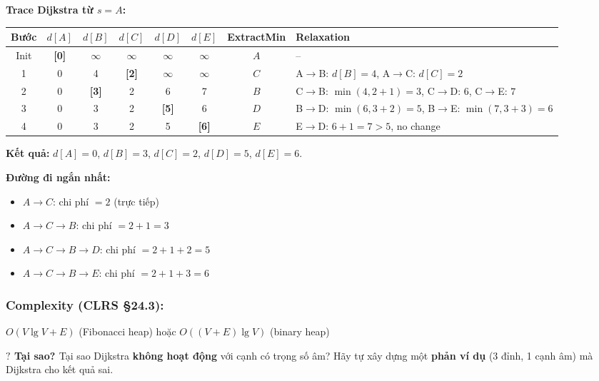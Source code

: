\documentclass[10pt]{article}
\newcommand{\whyprompt}[1]{%
  \begin{tcolorbox}[colback=yellow!8!white, colframe=orange!70!yellow, leftrule=3pt,
    toprule=0pt, bottomrule=0pt, rightrule=0pt,
    boxsep=2pt, left=6pt, right=6pt, top=4pt, bottom=4pt]
  {\small\textbf{\textcolor{orange!80!black}{$\boldsymbol{?}$ Tại sao? }} #1}
  \end{tcolorbox}}
\providecommand{\tightlist}{\setlength{\itemsep}{0pt}\setlength{\parskip}{0pt}}
\begin{document}
\textbf{Trace Dijkstra từ $s = A$:}

\begin{center}
\begin{tabular}{|c|c|c|c|c|c|c|l|}
\hline
\textbf{Bước} & $d[A]$ & $d[B]$ & $d[C]$ & $d[D]$ & $d[E]$ & \textbf{ExtractMin} & \textbf{Relaxation} \\
\hline
Init & \cellcolor{green!15}\textbf{[0]} & $\infty$ & $\infty$ & $\infty$ & $\infty$ & $A$ & -- \\
\hline
1 & 0 & 4 & \cellcolor{green!15}\textbf{[2]} & $\infty$ & $\infty$ & $C$ & \small A$\to$B: $d[B]=4$, A$\to$C: $d[C]=2$ \\
\hline
2 & 0 & \cellcolor{green!15}\textbf{[3]} & 2 & 6 & 7 & $B$ & \small C$\to$B: $\min(4, 2{+}1){=}3$, C$\to$D: $6$, C$\to$E: $7$ \\
\hline
3 & 0 & 3 & 2 & \cellcolor{green!15}\textbf{[5]} & 6 & $D$ & \small B$\to$D: $\min(6, 3{+}2){=}5$, B$\to$E: $\min(7, 3{+}3){=}6$ \\
\hline
4 & 0 & 3 & 2 & 5 & \cellcolor{green!15}\textbf{[6]} & $E$ & \small E$\to$D: $6{+}1{=}7 > 5$, no change \\
\hline
\end{tabular}
\label{tab:dijkstra-trace}
\end{center}

\textbf{Kết quả:} $d[A]=0$, $d[B]=3$, $d[C]=2$, $d[D]=5$, $d[E]=6$.

\textbf{Đường đi ngắn nhất:}
\begin{itemize}
\tightlist
\item $A \to C$: chi phí $= 2$ (trực tiếp)
\item $A \to C \to B$: chi phí $= 2 + 1 = 3$
\item $A \to C \to B \to D$: chi phí $= 2 + 1 + 2 = 5$
\item $A \to C \to B \to E$: chi phí $= 2 + 1 + 3 = 6$
\end{itemize}

\subsubsection{\texorpdfstring{Complexity (CLRS
\S 24.3):}{Complexity (CLRS 24.3):}}\label{complexity-clrs-24.3}

\(O(V \lg V + E)\) (Fibonacci heap) hoặc \(O((V+E) \lg V)\) (binary
heap)

\whyprompt{Tại sao Dijkstra \textbf{không hoạt động} với cạnh có trọng số âm? Hãy tự xây dựng một \textbf{phản ví dụ} (3 đỉnh, 1 cạnh âm) mà Dijkstra cho kết quả sai.}
\end{document}
